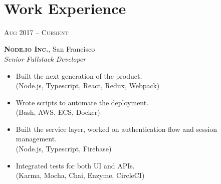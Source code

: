 \documentclass[10pt]{article}
\begin{document}
\color{text1} %


\par{\\[8pt] %
	

\begin{minipage}[t]{0.5\textwidth} %
\vspace{0pt} %
	

\section{Work Experience} 

{\raggedleft\textsc{Aug 2017 -- Current}\par}

{\raggedright\large \textbf{\textsc{Node.io Inc.}}, San Francisco\\
\textit{Senior Fullstack Developer}\\[5pt]}

\begin{itemize}
	\item Built the next generation of the product. \\
	{\color{Mahogany}(Node.js, Typescript, React, Redux, Webpack)}
	\item Wrote scripts to automate the deployment. \\
	{\color{Mahogany}(Bash, AWS, ECS, Docker)}
	\item Built the service layer, worked on authentication flow and session management. \\
	{\color{Mahogany}(Node.js, Typescript, Firebase)}
	\item Integrated tests for both UI and APIs. \\
	{\color{Mahogany}(Karma, Mocha, Chai, Enzyme, CircleCI)}
\end{itemize}


\end{minipage}}
\end{document}
